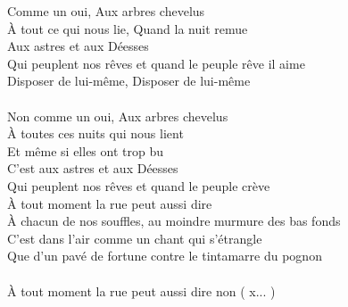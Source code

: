 \documentclass[11pt]{article}
\begin{document}
    Comme un oui, Aux arbres chevelus \\
    À tout ce qui nous lie, Quand la nuit remue \\
    Aux astres et aux Déesses \\
    Qui peuplent nos rêves et quand le peuple rêve il aime \\
    Disposer de lui-même, Disposer de lui-même \\
    \\
    Non comme un oui, Aux arbres chevelus \\
    À toutes ces nuits qui nous lient \\
    Et même si elles ont trop bu \\
    C'est aux astres et aux Déesses \\
    Qui peuplent nos rêves et quand le peuple crève \\
    À tout moment la rue peut aussi dire \\
    À chacun de nos souffles, au moindre murmure des bas fonds \\
    C'est dans l'air comme un chant qui s'étrangle \\
    Que d'un pavé de fortune contre le tintamarre du pognon \\
    \\
    À tout moment la rue peut aussi dire non ( x... )\\
    \\
\end{document}
